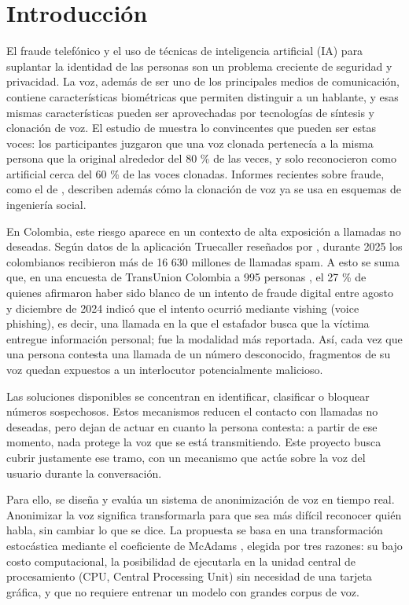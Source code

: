 \documentclass[10pt,twocolumn]{article}
\newcommand{\textcite}[1]{\citet{#1}}
\newcommand{\parencite}[1]{\citep{#1}}
\begin{document}
\section{Introducción}\label{sec:1}

El fraude telefónico y el uso de técnicas de inteligencia artificial (IA) para suplantar la identidad de las personas son un problema creciente de seguridad y privacidad. La voz, además de ser uno de los principales medios de comunicación, contiene características biométricas que permiten distinguir a un hablante, y esas mismas características pueden ser aprovechadas por tecnologías de síntesis y clonación de voz. El estudio de \textcite{barrington2025} muestra lo convincentes que pueden ser estas voces: los participantes juzgaron que una voz clonada pertenecía a la misma persona que la original alrededor del 80 \% de las veces, y solo reconocieron como artificial cerca del 60 \% de las voces clonadas. Informes recientes sobre fraude, como el de \textcite{groupib2025}, describen además cómo la clonación de voz ya se usa en esquemas de ingeniería social.

En Colombia, este riesgo aparece en un contexto de alta exposición a llamadas no deseadas. Según datos de la aplicación Truecaller reseñados por \textcite{acis2026}, durante 2025 los colombianos recibieron más de 16 630 millones de llamadas spam. A esto se suma que, en una encuesta de TransUnion Colombia a 995 personas \parencite{transunion2025}, el 27 \% de quienes afirmaron haber sido blanco de un intento de fraude digital entre agosto y diciembre de 2024 indicó que el intento ocurrió mediante vishing (voice phishing), es decir, una llamada en la que el estafador busca que la víctima entregue información personal; fue la modalidad más reportada. Así, cada vez que una persona contesta una llamada de un número desconocido, fragmentos de su voz quedan expuestos a un interlocutor potencialmente malicioso.

Las soluciones disponibles se concentran en identificar, clasificar o bloquear números sospechosos. Estos mecanismos reducen el contacto con llamadas no deseadas, pero dejan de actuar en cuanto la persona contesta: a partir de ese momento, nada protege la voz que se está transmitiendo. Este proyecto busca cubrir justamente ese tramo, con un mecanismo que actúe sobre la voz del usuario durante la conversación.

Para ello, se diseña y evalúa un sistema de anonimización de voz en tiempo real. Anonimizar la voz significa transformarla para que sea más difícil reconocer quién habla, sin cambiar lo que se dice. La propuesta se basa en una transformación estocástica mediante el coeficiente de McAdams \parencite{patino2021}, elegida por tres razones: su bajo costo computacional, la posibilidad de ejecutarla en la unidad central de procesamiento (CPU, Central Processing Unit) sin necesidad de una tarjeta gráfica, y que no requiere entrenar un modelo con grandes corpus de voz.
\end{document}
